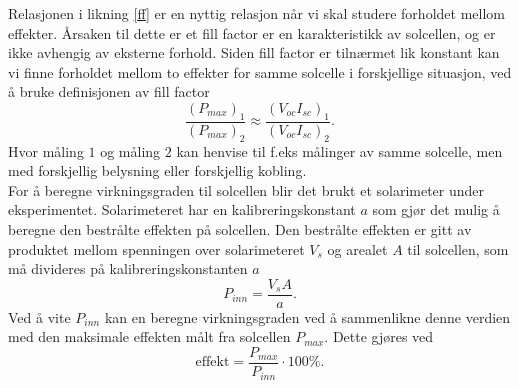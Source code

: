 \documentclass[%
 reprint,
 amsmath,amssymb,
 aps,
 norsk,
 booktabs
]{revtex4-1}
\begin{document}
Relasjonen i likning \eqref{ff} er en nyttig relasjon når vi skal studere forholdet mellom effekter. Årsaken til dette er et fill factor er en karakteristikk av solcellen, og er ikke avhengig av eksterne forhold. Siden fill factor er tilnærmet lik konstant kan vi finne forholdet mellom to effekter for samme solcelle i forskjellige situasjon, ved å bruke definisjonen av fill factor
\begin{equation}
  \frac{\left(P_{max}\right)_1}{\left(P_{max}\right)_2} \approx \frac{\left(V_{oc}I_{sc}\right)_1}{\left(V_{oc}I_{sc}\right)_2}. \label{maxP}
\end{equation}Hvor måling $1$ og måling $2$ kan henvise til f.eks målinger av samme solcelle, men med forskjellig belysning eller forskjellig kobling.\\
For å beregne virkningsgraden til solcellen blir det brukt et solarimeter under eksperimentet. Solarimeteret har en kalibreringskonstant $a$ som gjør det mulig å beregne den bestrålte effekten på solcellen. Den bestrålte effekten er gitt av produktet mellom spenningen over solarimeteret $V_s$ og arealet $A$ til solcellen, som må divideres på kalibreringskonstanten $a$
\begin{equation}
  P_{inn} = \frac{V_sA}{a} \label{kalibrering}.
\end{equation}
Ved å vite $P_{inn}$ kan en beregne virkningsgraden ved å sammenlikne denne verdien med den maksimale effekten målt fra solcellen $P_{max}$. Dette gjøres ved
\begin{equation}
  \text{effekt} = \frac{P_{max}}{P_{inn}}\cdot 100\%\label{effekt}.
\end{equation}
\end{document}
